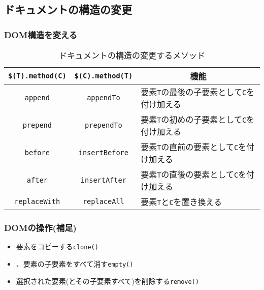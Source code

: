 \documentclass[dvipsk]{beamer}
\begin{document}
\subsection{ドキュメントの構造の変更}
\begin{frame}[containsverbatim]
\frametitle{DOM構造を変える}
\begin{table}[ht]
 \caption{ドキュメントの構造の変更するメソッド}\label{Insertreplace}
\begin{tabular}{|c|c|m{}|}
 \hline
 \texttt{\$(T).method(C)}&\texttt{\$(C).method(T)}&
    \multicolumn{1}{c|}{機能}\\\hline
 \texttt{append}&\texttt{appendTo}&
	 要素\texttt{T}の最後の子要素として\texttt{C}を付け加える\\ \hline
 \texttt{prepend}&\texttt{prependTo}&
	 要素\texttt{T}の初めの子要素として\texttt{C}を付け加える\\ \hline
 \texttt{before}&\texttt{insertBefore}&
	 要素\texttt{T}の直前の要素として\texttt{C}を付け加える\\ \hline
 \texttt{after}&\texttt{insertAfter}&
	 要素\texttt{T}の直後の要素として\texttt{C}を付け加える\\ \hline
 \texttt{replaceWith}&\texttt{replaceAll}&
	 要素\texttt{T}と\texttt{C}を置き換える\\ \hline
\end{tabular}\end{table}
\end{frame}
\begin{frame}[containsverbatim]
\frametitle{DOMの操作(補足)}
\begin{itemize}
 \item 要素をコピーする\texttt{clone()}
 \item 、要素の子要素をすべて消す\texttt{empty()}
 \item 選択された要素(とその子要素すべて)を削除する\texttt{remove()}
\end{itemize}
\end{frame}
\end{document}
